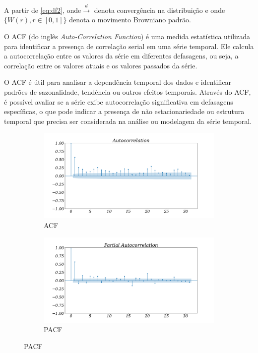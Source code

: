A partir de \eqref{eq:df2}, onde$\stackrel{d}{\longrightarrow}$ denota convergência na distribuição e onde $\{W(r), r \in[0,1]\}$ denota o movimento Browniano padrão.

O ACF (do inglês \textit{Auto-Correlation Function}) é uma medida estatística utilizada para identificar a presença de correlação serial em uma série temporal. Ele calcula a autocorrelação entre os valores da série em diferentes defasagens, ou seja, a correlação entre os valores atuais e os valores passados da série. 

O ACF é útil para analisar a dependência temporal dos dados e identificar padrões de sazonalidade, tendência ou outros efeitos temporais. Através do ACF, é possível avaliar se a série exibe autocorrelação significativa em defasagens específicas, o que pode indicar a presença de não estacionariedade ou estrutura temporal que precisa ser considerada na análise ou modelagem da série temporal.

\begin{figure}[H]
	\centering
	\caption{Autocorrelação e Autocorrelação parcial}
	\label{fig:acf}
	
	
	\begin{subfigure}{0.9\textwidth}
		\includegraphics[width=\linewidth]{Resultados/Figuras/acf} 
		\caption{ACF}\label{fig:acfa}
	\end{subfigure}
	

	\begin{subfigure}{0.9\textwidth}
		\includegraphics[width=\linewidth]{Resultados/Figuras/pacf}
		\caption{PACF}\label{fig:pacf}
	\end{subfigure}
	
\end{figure}

